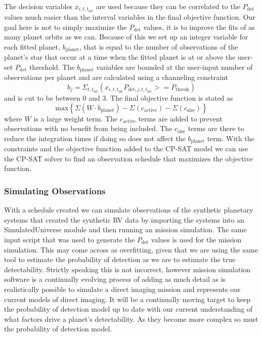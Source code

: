 The decision variables $x_{i, t, t_{\textrm{int}}}$ are used because they can
be correlated to the $P_\textrm{det}$ values much easier than the interval
variables in the final objective function. Our goal here is not to simply
maximize the $P_\textrm{det}$ values, it is to improve the fits of as many
planet orbits as we can. Because of this we set up an integer variable for each
fitted planet, $b_\textrm{planet}$, that is equal to the number of observations
of the planet's star that occur at a time when the fitted planet is at or above
the user-set $P_\textrm{det}$ threshold. The $b_\textrm{planet}$ variables are
bounded at the user-input number of observations per planet and are calculated
using a channeling constraint
\begin{equation}
  b_j = \Sigma_{t, t_\textrm{int}}(x_{i, t, t_\textrm{int}}P_{\textrm{det}, j, t, t_\textrm{int}} >= P_\textrm{thresh})
  \label{eq:bplanet}
\end{equation}
and is cut to be between 0 and 3. The final objective function is stated as 
\begin{equation}
  \textrm{max}{\left\{ \Sigma\left(W \cdot
  b_\textrm{planet}\right) - \Sigma\left( c_\textrm{active}\right) - \Sigma\left(
  c_\textrm{size}\right) \right\}}
  \label{eq:final_obj_function}
\end{equation}
where $W$ is a large weight term. The
$c_\textrm{active}$ terms are added to prevent observations with no benefit
from being included. The $c_\textrm{size}$ terms are there to reduce the
integration times if doing so does not affect the $b_\textrm{planet}$ term.
With the constraints and the objective function added to the CP-SAT model we
can use the CP-SAT solver to find an observation schedule that maximizes the
objective function.

\subsubsection{Simulating Observations}

With a schedule created we can simulate observations of the synthetic planetary
systems that created the synthetic RV data by importing the systems into an
 SimulatedUniverse module and then running an 
mission simulation. The same  input script that was used to
generate the $P_\textrm{det}$ values is used for the mission simulation. This
may come across as overfitting, given that we are using the same tool to
estimate the probability of detection as we are to estimate the true
detectability. Strictly speaking this is not incorrect, however mission
simulation software is a continually evolving process of adding as much detail
as is realistically possible to simulate a direct imaging mission and
represents our current models of direct imaging. It will be a continually
moving target to keep the probability of detection model up to date with our
current understanding of what factors drive a planet's detectability. As they
become more complex so must the probability of detection model.

